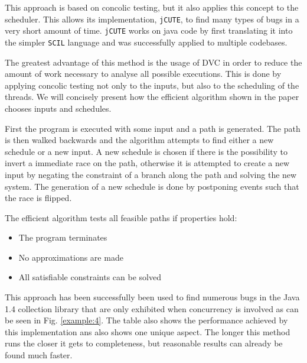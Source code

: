 \documentclass[10pt]{llncs}
\begin{document}
This approach is based on concolic testing, but it also applies this concept to the scheduler. This allows its implementation, \texttt{jCUTE}, to find many types of bugs in a very short amount of time. \texttt{jCUTE} works on java code by first translating it into the simpler \texttt{SCIL} language and was successfully applied to multiple codebases.

The greatest advantage of this method is the usage of DVC in order to reduce the amount of work necessary to analyse all possible executions. This is done by applying concolic testing not only to the inputs, but also to the scheduling of the threads. We will concisely present how the efficient algorithm shown in the paper chooses inputs and schedules.

First the program is executed with some input and a path is generated. The path is then walked backwards and the algorithm attempts to find either a new schedule or a new input. A new schedule is chosen if there is the possibility to invert a immediate race on the path, otherwise it is attempted to create a new input by negating the constraint of a branch along the path and solving the new system. The generation of a new schedule is done by postponing events such that the race is flipped.

The efficient algorithm tests all feasible paths if properties hold:

\begin{itemize}
	\item The program terminates
	\item No approximations are made
	\item All satisfiable constraints can be solved
\end{itemize}

This approach has been successfully been used to find numerous bugs in the Java 1.4 collection library that are only exhibited when concurrency is involved as can be seen in Fig. \ref{example:4}. The table also shows the performance achieved by this implementation ans also shows one unique aspect. The longer this method runs the closer it gets to completeness, but reasonable results can already be found much faster.
\end{document}

